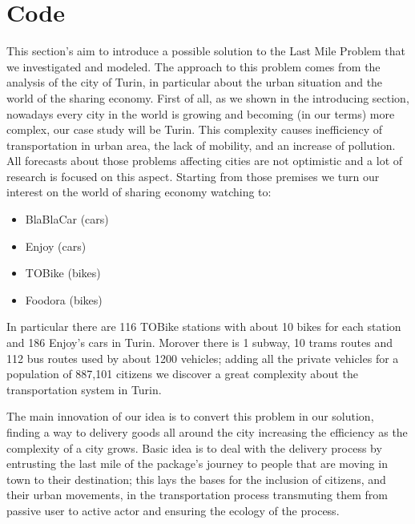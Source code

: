 \documentclass[11pt,a4paper]{article}
\begin{document}
 



\newpage


\newpage 
\section{Code}
This section's aim to introduce a possible solution to the Last Mile Problem that we investigated and modeled. 
The approach to this problem comes from the analysis of the city of Turin, in particular about the urban situation and the world of the sharing economy. 
First of all, as we shown in the introducing section, nowadays every city in the world is growing and becoming (in our terms) more complex, our case study will be Turin. 
This complexity causes inefficiency of transportation in urban area, the lack of mobility, and an increase of pollution. 
All forecasts about those problems  affecting cities are not optimistic and a lot of research is focused on this aspect. 
Starting from those premises we turn our interest on the world of sharing economy watching to:
\begin{center}
\begin{itemize}
\item BlaBlaCar (cars)
\item Enjoy (cars)
\item TOBike (bikes)
\item Foodora (bikes)
\end{itemize}
\end{center}
In particular there are 116 TOBike stations with about 10 bikes for each station and 186 Enjoy's cars in Turin. 
Morover there is 1 subway, 10 trams routes and 112 bus routes used by about 1200 vehicles; adding all the private vehicles for a population of 887,101 citizens we discover a great complexity about the transportation system in Turin. 

The main innovation of our idea is to convert this problem in our solution, finding a way to delivery goods all around the city increasing the efficiency as the complexity of a city grows. 
Basic idea is to deal with the delivery process by entrusting the last mile of the package's journey to people that are moving in town to their destination; this lays the bases for the inclusion of citizens, and their urban movements, in the transportation process transmuting them from passive user to active actor and ensuring the ecology of the process. 
\end{document}
